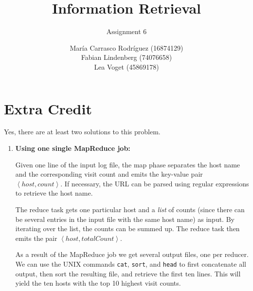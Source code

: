 \documentclass[a4paper,11pt,oneside]{book}
\title{Information Retrieval }
\subtitle{Assignment 6}
\author{ María Carrasco Rodríguez (16874129) \\
		Fabian Lindenberg (74076658)\\
		Lea Voget (45869178)}
\begin{document}
\kostspieligmaketitle


\chapter{Extra Credit}
 
Yes, there are at least two solutions to this problem. 

\begin{enumerate}
	\item \textbf{Using one single MapReduce job:}
	
				Given one line of the input log file, the map phase separates the host name and the corresponding visit count and emits the key-value pair $\left\langle host, count\right\rangle$. If necessary, the URL can be parsed using regular expressions to retrieve the host name.
				
				The reduce task gets one particular host and a \emph{list} of counts (since there can be several entries in the input file with the same host name) as input. By iterating over the list, the counts can be summed up. The reduce task then emits the pair $\left\langle host, totalCount\right\rangle$. 
				
				As a result of the MapReduce job we get several output files, one per reducer. We can use the UNIX commands \texttt{cat}, \texttt{sort}, and \texttt{head} to first concatenate all output, then sort the resulting file, and retrieve the first ten lines. This will yield the ten hosts with the top 10 highest visit counts.
				
\end{enumerate}
\end{document}
